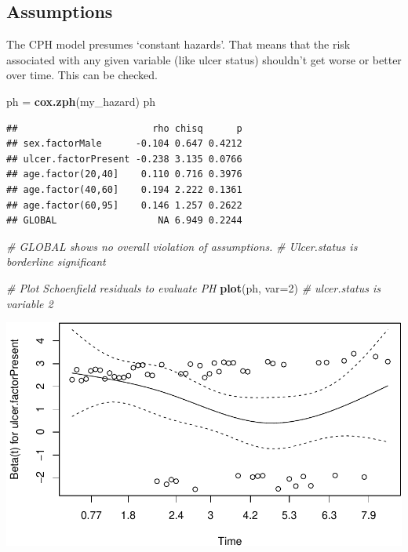 \documentclass[12pt,]{krantz}
\makeatletter
\newenvironment{Shaded}{\begin{snugshade}}{\end{snugshade}}
\newcommand{\CommentTok}[1]{\textcolor[rgb]{0.56,0.35,0.01}{\textit{#1}}}
\newcommand{\DataTypeTok}[1]{\textcolor[rgb]{0.13,0.29,0.53}{#1}}
\newcommand{\DecValTok}[1]{\textcolor[rgb]{0.00,0.00,0.81}{#1}}
\newcommand{\KeywordTok}[1]{\textcolor[rgb]{0.13,0.29,0.53}{\textbf{#1}}}
\newcommand{\NormalTok}[1]{#1}
\newcommand{\StringTok}[1]{\textcolor[rgb]{0.31,0.60,0.02}{#1}}
\newenvironment{kframe}{%
\medskip{}
\setlength{\fboxsep}{.8em}
 \def\at@end@of@kframe{}%
 \ifinner\ifhmode%
  \def\at@end@of@kframe{\end{minipage}}%
  \begin{minipage}{\columnwidth}%
 \fi\fi%
 \def\FrameCommand##1{\hskip\@totalleftmargin \hskip-\fboxsep
 \colorbox{shadecolor}{##1}\hskip-\fboxsep
     \hskip-\linewidth \hskip-\@totalleftmargin \hskip\columnwidth}%
 \MakeFramed {\advance\hsize-\width
   \@totalleftmargin\z@ \linewidth\hsize
   \@setminipage}}%
 {\par\unskip\endMakeFramed%
 \at@end@of@kframe}
\renewenvironment{Shaded}{\begin{kframe}}{\end{kframe}}
\theoremstyle{definition}
\theoremstyle{definition}
\theoremstyle{definition}
\theoremstyle{remark}
\makeatother
\begin{document}
\hypertarget{assumptions-1}{%
\subsection{Assumptions}\label{assumptions-1}}

The CPH model presumes `constant hazards'. That means that the risk
associated with any given variable (like ulcer status) shouldn't get
worse or better over time. This can be checked.

\begin{Shaded}
\begin{Highlighting}[]
\NormalTok{ph =}\StringTok{ }\KeywordTok{cox.zph}\NormalTok{(my_hazard)}
\NormalTok{ph}
\end{Highlighting}
\end{Shaded}

\begin{verbatim}
##                        rho chisq      p
## sex.factorMale      -0.104 0.647 0.4212
## ulcer.factorPresent -0.238 3.135 0.0766
## age.factor(20,40]    0.110 0.716 0.3976
## age.factor(40,60]    0.194 2.222 0.1361
## age.factor(60,95]    0.146 1.257 0.2622
## GLOBAL                  NA 6.949 0.2244
\end{verbatim}

\begin{Shaded}
\begin{Highlighting}[]
\CommentTok{# GLOBAL shows no overall violation of assumptions. }
\CommentTok{# Ulcer.status is borderline significant}

\CommentTok{# Plot Schoenfield residuals to evaluate PH}
\KeywordTok{plot}\NormalTok{(ph, }\DataTypeTok{var=}\DecValTok{2}\NormalTok{) }\CommentTok{# ulcer.status is variable 2}
\end{Highlighting}
\end{Shaded}

\includegraphics{10_survival_files/figure-latex/unnamed-chunk-11-1.pdf}
\end{document}

